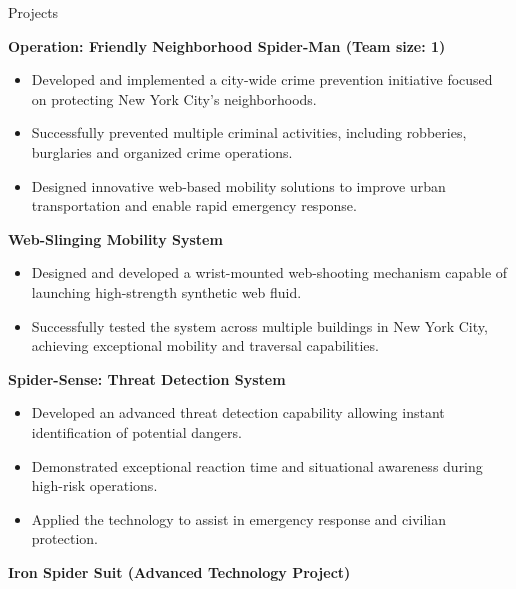 \documentclass{resume}
\begin{document}
\begin{rSection}{Projects}

{\bf Operation: Friendly Neighborhood Spider-Man (Team size: 1)}

    \begin{itemize}
        \vspace{-0.3cm}\item Developed and implemented a city-wide crime prevention initiative focused on protecting New York City's neighborhoods.
        \vspace{-0.3cm}\item Successfully prevented multiple criminal activities, including robberies, burglaries and organized crime operations.
        \vspace{-0.3cm}\item Designed innovative web-based mobility solutions to improve urban transportation and enable rapid emergency response.
    \end{itemize}

{\bf Web-Slinging Mobility System}
    \begin{itemize}
        \vspace{-0.3cm}\item Designed and developed a wrist-mounted web-shooting mechanism capable of launching high-strength synthetic web fluid.
        \vspace{-0.3cm}\item Successfully tested the system across multiple buildings in New York City, achieving exceptional mobility and traversal capabilities.
    \end{itemize}

 {\bf Spider-Sense: Threat Detection System}
    \begin{itemize}
        \vspace{-0.3cm}\item Developed an advanced threat detection capability allowing instant identification of potential dangers.
        \vspace{-0.3cm}\item Demonstrated exceptional reaction time and situational awareness during high-risk operations.
        \vspace{-0.3cm}\item Applied the technology to assist in emergency response and civilian protection.
    \end{itemize}

 {\bf Iron Spider Suit (Advanced Technology Project)}


\end{rSection}
\end{document}

